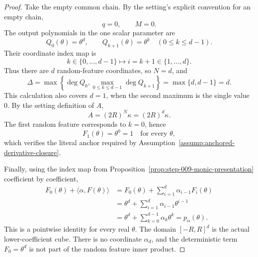 \begin{proof}
Take the empty common chain. By the setting's explicit convention for an empty chain,
\begin{equation}
\label{eq:appendix-display-253}
q=0,
\qquad
M=0.
\end{equation}
The output polynomials in the one scalar parameter are
\begin{equation}
\label{eq:appendix-display-254}
Q_0(\theta)=\theta^d,
\qquad
Q_{k+1}(\theta)=\theta^k
\quad(0\leq k\leq d-1).
\end{equation}
Their coordinate index map is
\begin{equation}
\label{eq:appendix-display-255}
k\in\{0,\ldots,d-1\}
\longmapsto
i=k+1\in\{1,\ldots,d\}.
\end{equation}
Thus there are \(d\) random-feature coordinates, so \(N=d\), and
\begin{equation}
\label{eq:appendix-display-256}
\Delta
=\max\left\{\deg Q_0,\max_{0\leq k\leq d-1}\deg Q_{k+1}\right\}
=\max\{d,d-1\}
=d.
\end{equation}
This calculation also covers \(d=1\), when the second maximum is the single value \(0\). By the setting definition of \(A\),
\begin{equation}
\label{eq:appendix-display-257}
A=(2R)^N\kappa=(2R)^d\kappa.
\end{equation}
The first random feature corresponds to \(k=0\), hence
\begin{equation}
\label{eq:appendix-display-258}
F_1(\theta)=\theta^0=1
\quad\text{for every }\theta,
\end{equation}
which verifies the literal anchor required by Assumption~\ref{assump:anchored-derivative-closure}.

Finally, using the index map from Proposition~\ref{prop:step-009-monic-presentation} coefficient by coefficient,
\begin{equation}
\label{eq:appendix-display-259}
\begin{aligned}
F_0(\theta)+\langle\alpha,F(\theta)\rangle
&=F_0(\theta)+\sum_{i=1}^{d}\alpha_{i-1}F_i(\theta)\\
&=\theta^d+\sum_{i=1}^{d}\alpha_{i-1}\theta^{i-1}\\
&=\theta^d+\sum_{k=0}^{d-1}\alpha_k\theta^k
=p_\alpha(\theta).
\end{aligned}
\end{equation}
This is a pointwise identity for every real \(\theta\). The domain \([-R,R]^d\) is the actual lower-coefficient cube. There is no coordinate \(\alpha_d\), and the deterministic term \(F_0=\theta^d\) is not part of the random feature inner product.
\end{proof}

